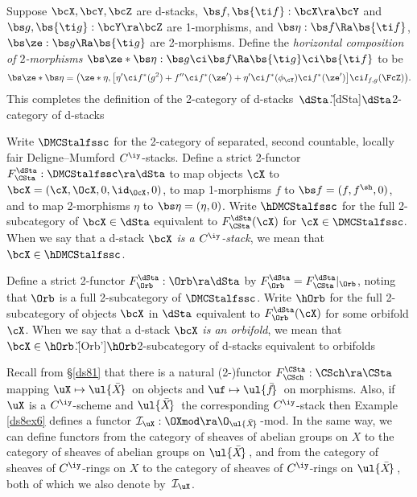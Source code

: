 \documentclass{article}
\begin{document}
\begin{dfn}
Suppose $\bcX,\bcY,\bcZ$ are d-stacks, $\bs f,\bs{\ti
f}:\bcX\ra\bcY$ and $\bs g,\bs{\ti g}:\bcY\ra\bcZ$ are 1-morphisms,
and $\bs\eta:\bs f\Ra\bs{\ti f}$, $\bs\ze:\bs g\Ra\bs{\ti g}$ are
2-morphisms. Define the {\it
horizontal
composition of\/ $2$-morphisms\/} $\bs\ze*\bs\eta:\bs g\ci\bs f\Ra
\bs{\ti g}\ci\bs{\ti f}$ to be
\begin{equation*}
\bs\ze*\bs\eta=\bigl(\ze*\eta,\bigl[\eta'\ci f^*(g^2)+f''\ci
f^*(\ze')+\eta'\ci f^*(\phi_\cY)\ci f^*(\ze')\bigr]\ci
I_{f,g}(\FcZ)\bigr).
\end{equation*}
This completes the definition of the 2-category of
d-stacks~$\dSta$.\G[dSta]{$\dSta$}{2-category of
d-stacks}

Write $\DMCStalfssc$ for the 2-category of separated, second
countable, locally fair Deligne--Mumford $C^\iy$-stacks. Define a
strict 2-functor
$F_\CSta^\dSta:\DMCStalfssc\ra\dSta$ to map objects $\cX$ to
$\bcX=(\cX,\OcX,0,\id_{\OcX},0)$, to map 1-morphisms $f$ to $\bs
f=(f,f^\sh,0)$, and to map 2-morphisms $\eta$ to $\bs\eta=(\eta,0)$.
Write $\hDMCStalfssc$ for the full 2-subcategory of $\bcX\in\dSta$
equivalent to $F_\CSta^\dSta(\cX)$ for $\cX\in\DMCStalfssc$. When we
say that a d-stack $\bcX$ {\it is a\/ $C^\iy$-stack}, we mean
that~$\bcX\in\hDMCStalfssc$.

Define a strict 2-functor $F_\Orb^\dSta:\Orb\ra\dSta$ by
$F_\Orb^\dSta=F_\CSta^\dSta\vert_\Orb$, noting that $\Orb$ is a full
2-subcategory of $\DMCStalfssc$. Write $\hOrb$ for the full
2-subcategory of objects $\bcX$ in $\dSta$ equivalent to
$F_\Orb^\dSta(\cX)$ for some orbifold $\cX$. When we say that a
d-stack $\bcX$ {\it is an orbifold}, we
mean that~$\bcX\in\hOrb$.\G[Orb']{$\hOrb$}{2-subcategory of d-stacks
equivalent to orbifolds}

Recall from \S\ref{ds81} that there is a natural (2-)functor
$F_\CSch^\CSta:\CSch\ra\CSta$ mapping $\uX\mapsto\ul{\bar X\!}\,$ on
objects and $\uf\mapsto\ul{\bar f\!}\,$ on morphisms. Also, if $\uX$
is a $C^\iy$-scheme and $\ul{\bar X\!}\,$ the corresponding
$C^\iy$-stack then Example \ref{ds8ex6} defines a functor ${\cal
I}_\uX:\OXmod\ra \O_{\smash{\ul{\bar X\!}\,}}$-mod. In the same way,
we can define functors from the category of sheaves of abelian
groups on $X$ to the category of sheaves of abelian groups on
$\ul{\bar X\!}\,$, and from the category of sheaves of $C^\iy$-rings
on $X$ to the category of sheaves of $C^\iy$-rings on $\ul{\bar
X\!}\,$, both of which we also denote by~${\cal I}_\uX$.


\end{dfn}
\end{document}
